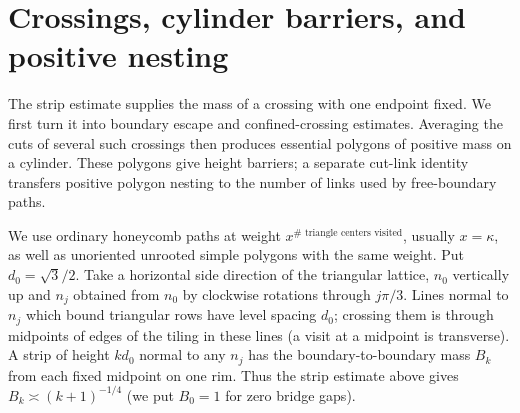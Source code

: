 \section{Crossings, cylinder barriers, and positive nesting}\label{c6:geometry}

The strip estimate supplies the mass of a crossing with one endpoint fixed. We first turn it into boundary escape and confined-crossing estimates. Averaging the cuts of several such crossings then produces essential polygons of positive mass on a cylinder. These polygons give height barriers; a separate cut-link identity transfers positive polygon nesting to the number of links used by free-boundary paths.

We use ordinary honeycomb paths at weight \(x^{\#\text{ triangle centers visited}}\), usually \(x=\kappa\), as well as unoriented unrooted simple polygons with the same weight. Put \(d_0=\sqrt3/2\). Take a horizontal side direction of the triangular lattice, \(n_0\) vertically up and \(n_j\) obtained from \(n_0\) by clockwise rotations through \(j\pi/3\). Lines normal to \(n_j\) which bound triangular rows have level spacing \(d_0\); crossing them is through midpoints of edges of the tiling in these lines (a visit at a midpoint is transverse). A strip of height \(k d_0\) normal to any \(n_j\) has the boundary-to-boundary mass \(B_k\) from each fixed midpoint on one rim. Thus the strip estimate above gives \(B_k\asymp(k+1)^{-1/4}\) (we put \(B_0=1\) for zero bridge gaps).

